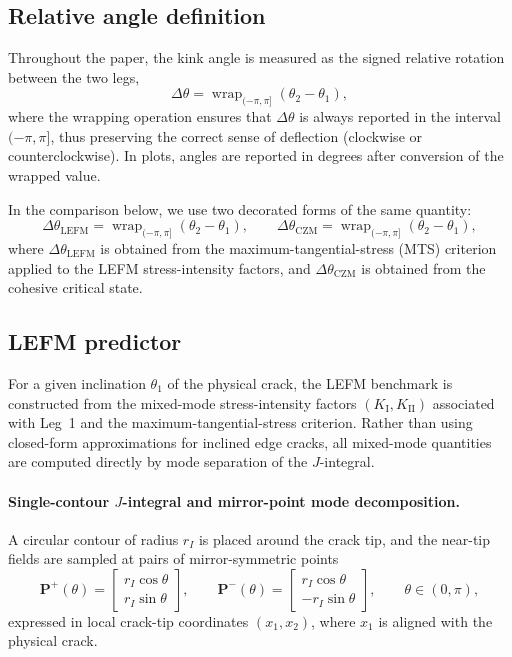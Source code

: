 \documentclass[smallextended]{svjour3}       %
\newcommand{\vb}[1]{\bm{#1}}      %
\begin{document}
\subsection{Relative angle definition}

Throughout the paper, the kink angle is measured as the signed relative
rotation between the two legs,
\begin{equation}
	\Delta\theta
	=
	\operatorname{wrap}_{(-\pi,\pi]}\!\left(\theta_2-\theta_1\right),
	\label{eq:dtheta_wrap}
\end{equation}
where the wrapping operation ensures that \(\Delta\theta\) is always reported
in the interval \((-\pi,\pi]\), thus preserving the correct sense of
deflection (clockwise or counterclockwise). In plots, angles are reported in
degrees after conversion of the wrapped value.

In the comparison below, we use two decorated forms of the same quantity:
\[
\Delta\theta_{\mathrm{LEFM}}
=
\operatorname{wrap}_{(-\pi,\pi]}\!\left(\theta_2-\theta_1\right),
\qquad
\Delta\theta_{\mathrm{CZM}}
=
\operatorname{wrap}_{(-\pi,\pi]}\!\left(\theta_2-\theta_1\right),
\]
where \(\Delta\theta_{\mathrm{LEFM}}\) is obtained from the maximum-tangential-stress
(MTS) criterion applied to the LEFM stress-intensity factors, and
\(\Delta\theta_{\mathrm{CZM}}\) is obtained from the cohesive critical state.

\subsection{LEFM predictor}

For a given inclination \(\theta_1\) of the physical crack, the LEFM
benchmark is constructed from the mixed-mode stress-intensity factors
\((K_{\mathrm I},K_{\mathrm{II}})\) associated with Leg~1 and the
maximum-tangential-stress criterion. Rather than using closed-form
approximations for inclined edge cracks, all mixed-mode quantities are
computed directly by mode separation of the \(J\)-integral.

\paragraph{Single-contour \(J\)-integral and mirror-point mode decomposition.}
A circular contour of radius \(r_I\) is placed around the crack tip, and the
near-tip fields are sampled at pairs of mirror-symmetric points
\[
\vb P^{+}(\theta)=
\begin{bmatrix}
	r_I\cos\theta\\
	r_I\sin\theta
\end{bmatrix},
\qquad
\vb P^{-}(\theta)=
\begin{bmatrix}
	r_I\cos\theta\\
	-r_I\sin\theta
\end{bmatrix},
\qquad
\theta\in(0,\pi),
\]
expressed in local crack-tip coordinates \((x_1,x_2)\), where \(x_1\) is
aligned with the physical crack.
\end{document}
